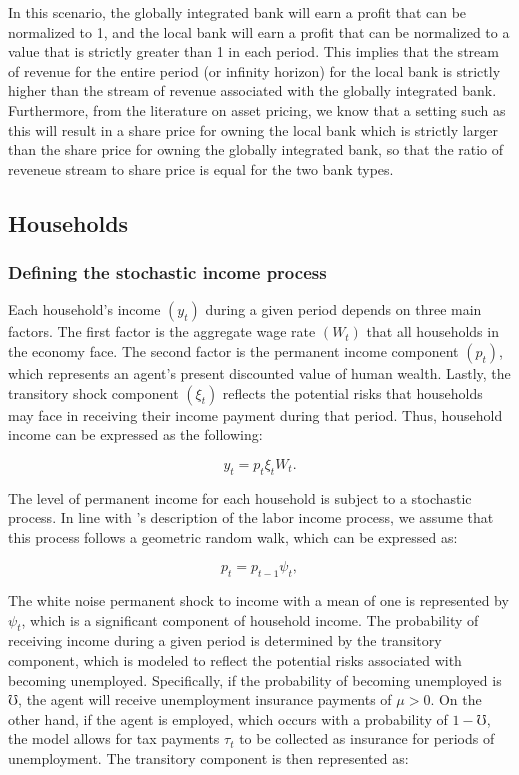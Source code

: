 \par In this scenario, the globally integrated bank will earn a profit that can be normalized to 1, and the local bank will earn a profit that can be normalized to a value that is strictly greater than 1 in each period. This implies that the stream of revenue for the entire period (or infinity horizon) for the local bank is strictly higher than the stream of revenue associated with the globally integrated bank. Furthermore, from the literature on asset pricing, we know that a setting such as this will result in a share price for owning the local bank which is strictly larger than the share price for owning the globally integrated bank, so that the ratio of reveneue stream to share price is equal for the two bank types.

\subsection{Households}

\subsubsection{Defining the stochastic income process}

\par Each household's income $(y_t)$ during a given period depends on three main factors. The first factor is the aggregate wage rate $(W_t)$ that all households in the economy face. The second factor is the permanent income component $(p_t)$, which represents an agent's present discounted value of human wealth. Lastly, the transitory shock component $(\xi_t)$ reflects the potential risks that households may face in receiving their income payment during that period. Thus, household income can be expressed as the following:

$$ y_t = p_t \xi_t W_t . $$

\par The level of permanent income for each household is subject to a stochastic process. In line with \cite{mf1957}'s description of the labor income process, we assume that this process follows a geometric random walk, which can be expressed as:

$$ p_t = p_{t-1} \psi_{t}, $$

\par The white noise permanent shock to income with a mean of one is represented by $\psi_t$, which is a significant component of household income. The probability of receiving income during a given period is determined by the transitory component, which is modeled to reflect the potential risks associated with becoming unemployed. Specifically, if the probability of becoming unemployed is $\mho$, the agent will receive unemployment insurance payments of $\mu > 0$. On the other hand, if the agent is employed, which occurs with a probability of $1 - \mho$, the model allows for tax payments $\tau_t$ to be collected as insurance for periods of unemployment. The transitory component is then represented as:

